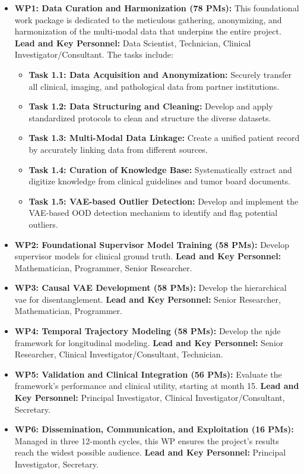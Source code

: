 \documentclass[11pt, a4paper]{article}
\begin{document}
\begin{itemize}
    \item \textbf{WP1: Data Curation and Harmonization (78 PMs):} This foundational work package is dedicated to the meticulous gathering, anonymizing, and harmonization of the multi-modal data that underpins the entire project.
    \textbf{Lead and Key Personnel:} Data Scientist, Technician, Clinical Investigator/Consultant.
    The tasks include:
    \begin{itemize}
        \item \textbf{Task 1.1: Data Acquisition and Anonymization:} Securely transfer all clinical, imaging, and pathological data from partner institutions.
        \item \textbf{Task 1.2: Data Structuring and Cleaning:} Develop and apply standardized protocols to clean and structure the diverse datasets.
        \item \textbf{Task 1.3: Multi-Modal Data Linkage:} Create a unified patient record by accurately linking data from different sources.
        \item \textbf{Task 1.4: Curation of Knowledge Base:} Systematically extract and digitize knowledge from clinical guidelines and tumor board documents.
        \item \textbf{Task 1.5: VAE-based Outlier Detection:} Develop and implement the VAE-based OOD detection mechanism to identify and flag potential outliers.
    \end{itemize}
    \item \textbf{WP2: Foundational Supervisor Model Training (58 PMs):} Develop supervisor models for clinical ground truth. \textbf{Lead and Key Personnel:} Mathematician, Programmer, Senior Researcher.
    \item \textbf{WP3: Causal VAE Development (58 PMs):} Develop the hierarchical \gls{vae} for disentanglement. \textbf{Lead and Key Personnel:} Senior Researcher, Mathematician, Programmer.
    \item \textbf{WP4: Temporal Trajectory Modeling (58 PMs):} Develop the \gls{njde} framework for longitudinal modeling. \textbf{Lead and Key Personnel:} Senior Researcher, Clinical Investigator/Consultant, Technician.
    \item \textbf{WP5: Validation and Clinical Integration (56 PMs):} Evaluate the framework's performance and clinical utility, starting at month 15. \textbf{Lead and Key Personnel:} Principal Investigator, Clinical Investigator/Consultant, Secretary.
    \item \textbf{WP6: Dissemination, Communication, and Exploitation (16 PMs):} Managed in three 12-month cycles, this WP ensures the project's results reach the widest possible audience. \textbf{Lead and Key Personnel:} Principal Investigator, Secretary.

\end{itemize}
\end{document}
